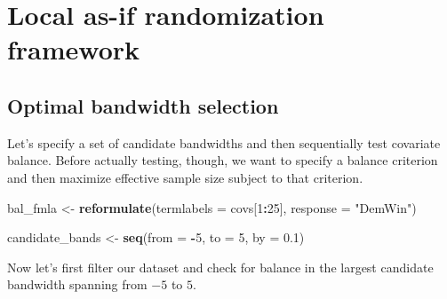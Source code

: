 \documentclass[
  12pt,
  leqno]{article}
\newenvironment{Shaded}{\begin{snugshade}}{\end{snugshade}}
\newcommand{\AttributeTok}[1]{\textcolor[rgb]{0.13,0.29,0.53}{#1}}
\newcommand{\DecValTok}[1]{\textcolor[rgb]{0.00,0.00,0.81}{#1}}
\newcommand{\FloatTok}[1]{\textcolor[rgb]{0.00,0.00,0.81}{#1}}
\newcommand{\FunctionTok}[1]{\textcolor[rgb]{0.13,0.29,0.53}{\textbf{#1}}}
\newcommand{\NormalTok}[1]{#1}
\newcommand{\OtherTok}[1]{\textcolor[rgb]{0.56,0.35,0.01}{#1}}
\newcommand{\SpecialCharTok}[1]{\textcolor[rgb]{0.81,0.36,0.00}{\textbf{#1}}}
\newcommand{\StringTok}[1]{\textcolor[rgb]{0.31,0.60,0.02}{#1}}
\begin{document}
\normalsize

\section{Local as-if randomization framework}

\subsection{Optimal bandwidth selection}

Let's specify a set of candidate bandwidths and then sequentially test
covariate balance. Before actually testing, though, we want to specify a
balance criterion and then maximize effective sample size subject to
that criterion.

\scriptsize

\begin{Shaded}
\begin{Highlighting}[]
\NormalTok{bal\_fmla }\OtherTok{\textless{}{-}} \FunctionTok{reformulate}\NormalTok{(}\AttributeTok{termlabels =}\NormalTok{ covs[}\DecValTok{1}\SpecialCharTok{:}\DecValTok{25}\NormalTok{], }\AttributeTok{response =} \StringTok{"DemWin"}\NormalTok{)}

\NormalTok{candidate\_bands }\OtherTok{\textless{}{-}} \FunctionTok{seq}\NormalTok{(}\AttributeTok{from =} \SpecialCharTok{{-}}\DecValTok{5}\NormalTok{, }\AttributeTok{to =} \DecValTok{5}\NormalTok{, }\AttributeTok{by =} \FloatTok{0.1}\NormalTok{)}
\end{Highlighting}
\end{Shaded}

\normalsize

Now let's first filter our dataset and check for balance in the largest
candidate bandwidth spanning from \(-5\) to \(5\).

\scriptsize
\end{document}
